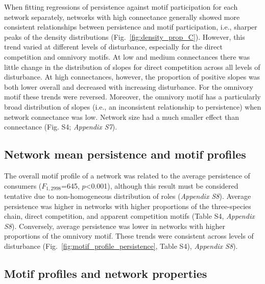 \documentclass[12pt]{article}
\begin{document}
\begin{spacing}{2.0}
            When fitting regressions of persistence against motif participation for each network separately, networks with high connectance generally showed more consistent relationships between persistence and motif participation, i.e., sharper peaks of the density distributions (Fig.~\ref{fig:density_prop_C}).
            However, this trend varied at different levels of disturbance, especially for the direct competition and omnivory motifs.
            At low and medium connectances there was little change in the distribution of slopes for direct competition across all levels of disturbance. 
            At high connectances, however, the proportion of positive slopes was both lower overall and decreased with increasing disturbance. 
            For the omnivory motif these trends were reversed. 
            Moreover, the omnivory motif has a particularly broad distribution of slopes (i.e., an inconsistent relationship to persistence) when network connectance was low. 
            Network size had a much smaller effect than connectance (Fig. S4; \emph{Appendix S7}).


    \subsection*{Network mean persistence and motif profiles}
        The overall motif profile of a network was related to the average persistence of consumers ($F_{1,2998}$=645, $p$\textless0.001), although this result must be considered tentative due to non-homogeneous distribution of roles (\emph{Appendix S8}). 
        Average persistence was higher in networks with higher proportions of the three-species chain, direct competition, and apparent competition motifs (Table S4, \emph{Appendix S8}). 
        Conversely, average persistence was lower in networks with higher proportions of the omnivory motif. 
        These trends were consistent across levels of disturbance (Fig.~\ref{fig:motif_profile_persistence}, Table S4), \emph{Appendix S8}).%


    \subsection*{Motif profiles and network properties}


\end{spacing}
\end{document}
